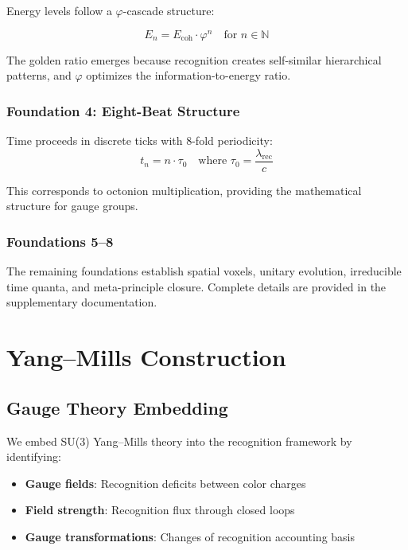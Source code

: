 \documentclass[11pt]{amsart}
\newcommand{\Ecoh}{E_{\text{coh}}}
\newcommand{\lambdarec}{\lambda_{\text{rec}}}
\newcommand{\taunaught}{\tau_0}
\begin{document}
Energy levels follow a $\varphi$-cascade structure:

\begin{equation}
E_n = \Ecoh \cdot \varphi^n \quad \text{for } n \in \mathbb{N}
\end{equation}

The golden ratio emerges because recognition creates self-similar hierarchical patterns, and $\varphi$ optimizes the information-to-energy ratio.

\subsubsection{Foundation 4: Eight-Beat Structure}

Time proceeds in discrete ticks with 8-fold periodicity:
\begin{equation}
t_n = n \cdot \taunaught \quad \text{where } \taunaught = \frac{\lambdarec}{c}
\end{equation}

This corresponds to octonion multiplication, providing the mathematical structure for gauge groups.

\subsubsection{Foundations 5--8}

The remaining foundations establish spatial voxels, unitary evolution, irreducible time quanta, and meta-principle closure. Complete details are provided in the supplementary documentation.

\section{Yang--Mills Construction}

\subsection{Gauge Theory Embedding}

We embed SU(3) Yang--Mills theory into the recognition framework by identifying:

\begin{itemize}
\item \textbf{Gauge fields}: Recognition deficits between color charges
\item \textbf{Field strength}: Recognition flux through closed loops  
\item \textbf{Gauge transformations}: Changes of recognition accounting basis
\end{itemize}
\end{document}

